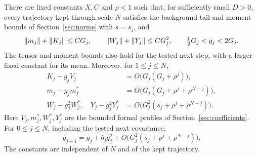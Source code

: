 \begin{proposition}\label{flow:prefix}
There are fixed constants $X,C$ and $\rho<1$ such that, for sufficiently
small $D>0$, every trajectory kept through scale $N$ satisfies the
background tail and moment bounds of Section~\ref{sec:norms} with $s=s_j$,
and
\begin{equation}\label{flow:rough}
 \left\lVert m_j\right\rVert+\left\lVert K_j\right\rVert\le CG_j,\qquad
 \left\lVert W_j\right\rVert+\left\lVert Y_j\right\rVert\le CG_j^2,\qquad
 \tfrac12G_j<g_j<2G_j .
\end{equation}
The tensor and moment bounds also hold for the tested next step, with a
larger fixed constant for its mean.  Moreover, for $1\le j\le N$,
\begin{align}
 K_j-g_jV_j&=O\bigl(G_j(G_j+\rho^j)\bigr),\label{flow:cov-profile}\\
 m_j-g_jm_j^*&=O\bigl(G_j(G_j+\rho^j+\rho^{N-j})\bigr),
 \label{flow:mean-profile}\\
 W_j-g_j^2W_j^*,\quad Y_j-g_j^2Y_j^*
 &=O\bigl(G_j^2(s_j+\rho^j+\rho^{N-j})\bigr).
 \label{flow:higher-profile}
\end{align}
Here $V_j,m_j^*,W_j^*,Y_j^*$ are the bounded formal profiles of
Section~\ref{sec:coefficients}.  For $0\le j\le N$, including the tested
next covariance,
\begin{equation}\label{flow:variance-recursion}
 g_{j+1}=g_j+b_jg_j^2+
 O\bigl(G_j^2(s_j+\rho^j+\rho^{N-j})\bigr).
\end{equation}
The constants are independent of $N$ and of the kept trajectory.
\end{proposition}

